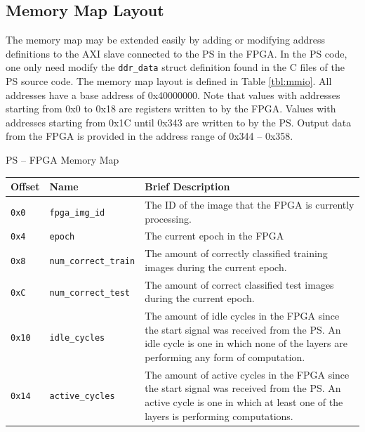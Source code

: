 \subsection{Memory Map Layout}\label{mmio-lay}
The memory map may be extended easily by adding or modifying address definitions to the AXI slave connected to the PS in the FPGA. In the PS code, one only need modify the \texttt{ddr\_data} struct definition found in the C files of the PS source code. The memory map layout is defined in Table \ref{tbl:mmio}. All addresses have a base address of 0x40000000. Note that values with addresses starting from 0x0 to 0x18 are registers written to by the FPGA. Values with addresses starting from 0x1C until 0x343 are written to by the PS. Output data from the FPGA is provided in the address range of 0x344 -- 0x358.
\begin{table}
	\centering
	\Large PS -- FPGA Memory Map \\\vspace{0.5em}
	\normalsize
	\begin{tabularx}{\textwidth}{|l| l| X|}
		\hline
		\textbf{Offset}	& \textbf{Name} & \textbf{Brief Description}\\\hline
		
		\texttt{0x0}	& 
		\texttt{fpga\_img\_id} & 
		The ID of the image that the FPGA is currently processing. \\\hline
		
		\texttt{0x4} &
		\texttt{epoch} &
		The current epoch in the FPGA \\\hline
		
		\texttt{0x8} &
		\texttt{num\_correct\_train} &
		The amount of correctly classified training images during the current epoch. \\\hline 
		
		\texttt{0xC} &
		\texttt{num\_correct\_test} &
		The amount of correct classified test images during the current epoch. \\\hline
		
		\texttt{0x10} &
		\texttt{idle\_cycles} &
		The amount of idle cycles in the FPGA since the start signal was received from the PS. An idle cycle is one in which none of the layers are performing any form of computation. \\\hline
		
		\texttt{0x14} &
		\texttt{active\_cycles} &
		The amount of active cycles in the FPGA since the start signal was received from the PS. An active cycle is one in which at least one of the layers is performing computations. \\\hline
		

\end{tabularx}
\end{table}

